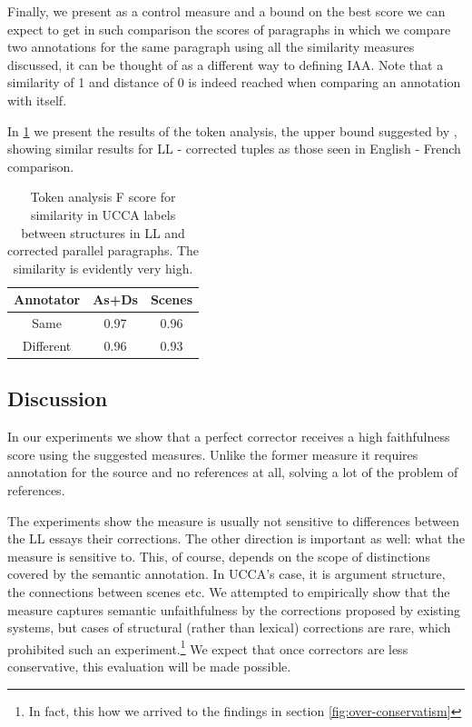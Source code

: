 \documentclass[letter,11pt]{article}
\begin{document}
		Finally, we present as a control measure and a bound on the best score
		we can expect to get in such comparison the scores of paragraphs
		in which we compare two annotations for the same paragraph using all
		the similarity measures discussed, it can be thought of as a different
		way to defining IAA. Note that a similarity
		of 1 and distance of 0 is indeed reached when comparing an annotation with itself.
		
		In \ref{tab:Token_analysis} we present the results of the token analysis, the
		upper bound suggested by \cite{sulem2015conceptual}, showing similar
		results for LL - corrected tuples as those seen in English
		- French comparison.
		\vspace*{-\baselineskip}
		\begin{table}[h!]
			\centering
			\begin{tabular}{c|c|c}
				Annotator& As+Ds & Scenes\\
				\hline
				Same  & 0.97 & 0.96\\
				Different & 0.96
				& 0.93
				\\
			\end{tabular}
			\caption{Token analysis F score for similarity in UCCA labels between structures in LL and corrected parallel paragraphs. The similarity is evidently very high.\label{tab:Token_analysis}}
		\end{table}
		
		\subsection{Discussion}
		In our experiments we show that a perfect corrector receives a high faithfulness score using the suggested measures. Unlike the former measure it requires annotation for the source and no references at all, solving a lot of the problem of references.
		
		The experiments show the measure is usually not sensitive to differences between the LL essays their corrections. The other direction is important as well: what the measure is sensitive to. This, of course, depends on the scope of distinctions covered by the semantic annotation. In UCCA's case, it is argument structure, the connections between scenes etc. We attempted to empirically show that the measure
		captures semantic unfaithfulness by the corrections proposed by existing systems, but cases of structural (rather than lexical) corrections are rare, which prohibited such an experiment.\footnote{In fact, this how we arrived to the findings in section \ref{fig:over-conservatism}} We expect that once correctors are less conservative, this evaluation will be made possible.
		
\end{document}
